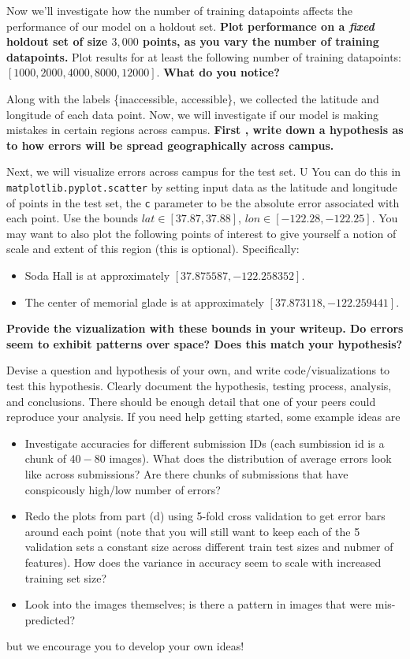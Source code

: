 \documentclass[preview]{standalone}
\begin{document}
\begin{Parts}
\Part Now we'll investigate how the number of training datapoints affects the performance of our model on a holdout set. \textbf{Plot performance on a \emph{fixed} holdout set of size $3,000$ points, as you vary the number of training datapoints.} Plot results for at least the following number of training datapoints: $[1000,2000,4000,8000,12000]$. \textbf{What do you notice?}

\Part Along with the labels \{inaccessible, accessible\}, we collected the latitude and longitude of each data point. Now, we will investigate if our model is making mistakes in certain regions across campus. \textbf{First , write down a hypothesis as to how errors will be spread geographically across campus.}

Next, we will visualize errors across campus for the test set. U
You can do this in \\\texttt{matplotlib.pyplot.scatter} by setting input data as the latitude and longitude of points in the test set,  the \texttt{c} parameter to be the absolute error associated with each point. Use the bounds $lat \in [37.87,37.88]$, $lon \in [-122.28,-122.25]$. You may want to also plot the following points of interest to give yourself a notion of scale and extent of this region (this is optional). Specifically:
\begin{itemize}
\item Soda Hall is at approximately $[37.875587, -122.258352]$.
\item The center of memorial glade is at approximately $[37.873118, -122.259441]$.
\end{itemize}

\textbf{Provide the vizualization with these bounds in your writeup. Do errors seem to exhibit patterns over space? Does this match your hypothesis?}


\Part Devise a question and hypothesis of your own, and write code/visualizations to test this hypothesis. Clearly document the hypothesis, testing process, analysis, and conclusions. There should be enough detail that one of your peers could reproduce your analysis. If you need help getting started, some example ideas are
\begin{itemize}
\item Investigate accuracies for different submission IDs (each sumbission id is a chunk of $40-80$ images). What does the distribution of average errors look like across submissions? Are there chunks of submissions that have conspicously high/low number of errors?
\item Redo the plots from part (d) using 5-fold cross validation to get error bars around each point (note that you will still want to keep each of the 5 validation sets a constant size across different train test sizes and nubmer of features). How does the variance in accuracy seem to scale with increased training set size?
\item Look into the images themselves; is there a pattern in images that were mis-predicted?
\end{itemize}
but we encourage you to develop your own ideas!


\end{Parts}
\end{document}
